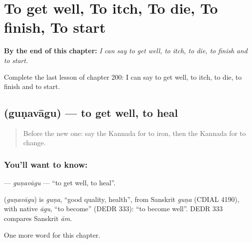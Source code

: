 
\chapter{To get well, To itch, To die, To finish, To start}
\label{ch:ka-to-get-well-to-itch-to-die-to-finish-to-start}

\begin{chapteropening}
\textbf{By the end of this chapter:} \emph{I can say to get well, to itch, to die, to finish and to start.}

Complete the last lesson of chapter 200: I can say to get well, to itch, to die, to finish and to start.
\end{chapteropening}

\section[\texorpdfstring{\kn{ಗುಣವಾಗು} (guṇavāgu)}{ಗುಣವಾಗು (guṇavāgu)}]{ (guṇavāgu) — to get well, to heal}

\label{lesson:KA-C200-gunavagu}



\begin{quote}
Before the new one: say the Kannada for to iron, then the Kannada for to change.
\end{quote}

\subsection*{You'll want to know: }
\textbf{} — \emph{guṇavāgu} — \textquotedblleft{}to get well, to heal\textquotedblright{}.

\begin{cousinweb}
\textbf{} (\emph{guṇavāgu}) is \emph{guṇa}, \textquotedblleft{}good quality, health\textquotedblright{}, from Sanskrit \emph{guṇa} (CDIAL 4190), with native \emph{āgu}, \textquotedblleft{}to become\textquotedblright{} (DEDR 333): \textquotedblleft{}to become well\textquotedblright{}. DEDR 333 compares Sanskrit \emph{ām}.
\end{cousinweb}

\begin{grammarlens}[title={What you've built}]
One more word for this chapter.
\end{grammarlens}

